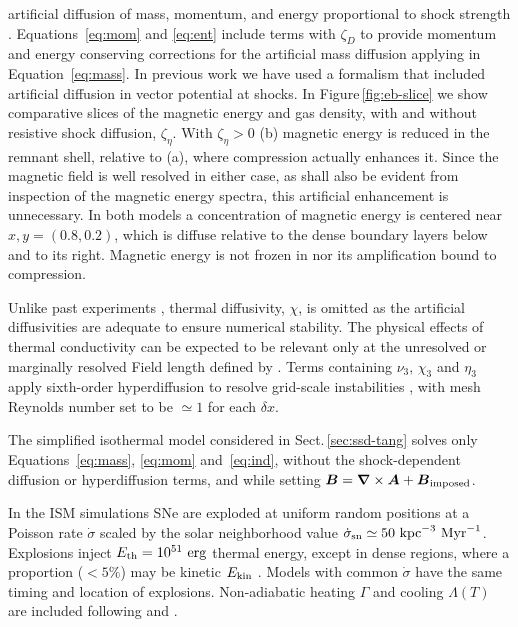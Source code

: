 \documentclass[preprint2]{aastex63}
\newcommand\SNr{\dot\sigma_{\rm sn}}
\newcommand\ESK{E_{\rm kin}}
\newcommand\EST{E_{\rm th}}
\newcommand{\vect}[1]{{{\mbox{\boldmath $#1$}}}}%
\newcommand\kpc{~ {\rm kpc}}
\newcommand\dx{ {\delta x}}
\newcommand\Myr{~ {\rm Myr}}
\newcommand\erg{~ {\rm erg}}
\newcommand{\fg}[1]{\textcolor{mypurple}{#1}}
\begin{document}
 artificial diffusion of mass, momentum, and energy proportional to shock
 strength \citep[see][for details]{GMKSH20}.
 {Equations~\eqref{eq:mom} and \eqref{eq:ent} include terms with $\zeta_D$}
 {to} {provide momentum and energy conserving corrections for} {the}
 {artificial mass diffusion applying in Equation~\eqref{eq:mass}.}
 \fg{In previous work \citet{Gent:2013b} we have used a formalism that
 included artificial diffusion in vector potential at shocks.
 In Figure\,\ref{fig:eb-slice} we show comparative slices of the magnetic
 energy and gas density, with and without resistive shock diffusion,
 $\zeta_\eta$.
 With $\zeta_\eta>0$ (b) magnetic energy is reduced in the remnant shell,
 relative to (a),} where compression actually enhances it.
 \fg{Since the magnetic field is well resolved in either case, as shall also
 be evident from inspection of the magnetic energy spectra, this artificial
 enhancement is unnecessary.
 In both models a concentration of magnetic energy is centered near 
 $x,y=(0.8,0.2)$, which is diffuse relative to the dense boundary layers below
 and to its right.
 Magnetic energy is not frozen in nor its amplification bound to compression.}    

  {Unlike past} experiments \citep{Gent:2013b,Gent:2013a,GMKSH20},
 thermal diffusivity, $\chi$, {is omitted as} the artificial diffusivities
 are adequate to ensure numerical stability.
 {The} physical effects of thermal conductivity can be expected to be
 relevant only at the unresolved or marginally resolved Field length defined
 by \citet[][named after George Field, not the magnetic field]{BM90}.
 Terms containing $\nu_3,\,\chi_3$ and $\eta_3$ apply sixth-order hyperdiffusion
 to resolve grid-scale instabilities \citep[see, e.g.,][]{ABGS02,HB04}, {
 with mesh Reynolds number set to be $\simeq1$ for each $\dx$}.

 {The simplified isothermal model considered in
Sect.\,\ref{sec:ssd-tang} solves only Equations~{\eqref{eq:mass},}
 \eqref{eq:mom} and~\eqref{eq:ind}, without the shock-dependent diffusion or
 hyperdiffusion terms, and while setting
 $\vect{B}=\vect\nabla\times\vect{A}+\vect{B}_{\rm imposed}$.}

 {In the ISM simulations} SNe are exploded at {uniform} random positions
 at a Poisson rate $\dot\sigma$ {scaled by} the solar neighborhood
 value $\SNr\simeq 50\kpc^{-3}\Myr^{-1}$.
 Explosions inject $\EST = 10^{51}\erg$ thermal energy, except in
 dense regions, where a proportion {($<5\%$) may be} kinetic $\ESK$ 
 \citep[see][]{GMKSH20}.
 {Models with common $\dot\sigma$ have the same timing and location of
 explosions.}
 Non-adiabatic heating $\Gamma$ and cooling $\Lambda (T)$ are included
 \citep{Gent:2013b} following \citet{Wolfire:1995} and \citet{Sarazin:1987}.
\end{document}
